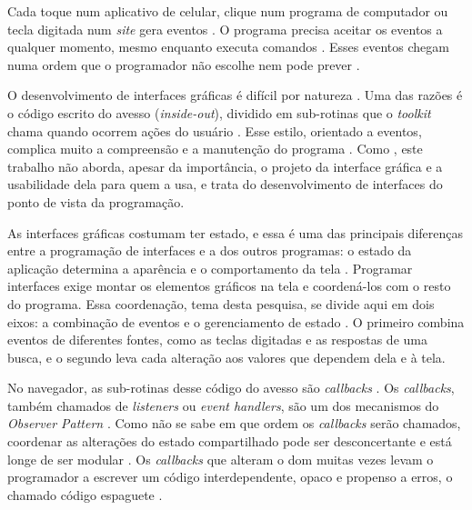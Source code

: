 
Cada toque num aplicativo de celular, clique num programa de computador ou
tecla digitada num \emph{site} gera eventos \cite[p. 52:1-2]{bainomugisha2013}.
O programa precisa aceitar os eventos a qualquer momento, mesmo enquanto
executa comandos \cite[p. 79]{myers1994}.
Esses eventos chegam numa ordem que o programador não escolhe nem pode
prever \cite[p. 52:2]{bainomugisha2013}.

O desenvolvimento de interfaces gráficas é difícil por natureza
\cite[p. 73]{myers1994}.
Uma das razões é o código escrito do avesso (\emph{inside-out}), dividido em
sub-rotinas que o \emph{toolkit} chama quando ocorrem ações do usuário
\cite[p. 75 e 79]{myers1994}.
Esse estilo, orientado a eventos, complica muito a compreensão e a
manutenção do programa \cite[p. 134]{fischer2007}.
Como \textcite[p. 5]{kiss2014}, este trabalho não aborda, apesar da
importância, o projeto da interface gráfica e a usabilidade dela para quem a usa, e
trata do desenvolvimento de interfaces do ponto de vista da programação.

As interfaces gráficas costumam ter estado, e essa é uma das principais
diferenças entre a programação de interfaces e a dos outros programas: o
estado da aplicação determina a aparência e o comportamento da tela
\cite[p. 230]{oney2012}.
Programar interfaces exige montar os elementos gráficos na tela e
coordená-los com o resto do programa.
Essa coordenação, tema desta pesquisa, se divide aqui em dois eixos: a
combinação de eventos \cite[p. 67]{meijer2012} e o gerenciamento de
estado \cite[p. 52:2]{bainomugisha2013}.
O primeiro combina eventos de diferentes fontes, como as teclas digitadas e
as respostas de uma busca, e o segundo leva cada alteração aos valores que
dependem dela e à tela.

No navegador, as sub-rotinas desse código do avesso são \emph{callbacks}
\cite[p. 1]{gallaba2015}.
Os \emph{callbacks}, também chamados de \emph{listeners} ou \emph{event handlers}, são um
dos mecanismos do \emph{Observer Pattern}
\cites[][ p. 52:2]{bainomugisha2013}[][ p. 1125]{salvaneschi2017}.
Como não se sabe em que ordem os \emph{callbacks} serão chamados, coordenar as
alterações do estado compartilhado pode ser desconcertante e está longe de ser
modular \cite[p. 926]{edwards2009}.
Os \emph{callbacks} que alteram o \gls{dom} muitas vezes levam o programador a
escrever um código interdependente, opaco e propenso a erros, o chamado código
espaguete \cite[p. 229]{oney2012}.

